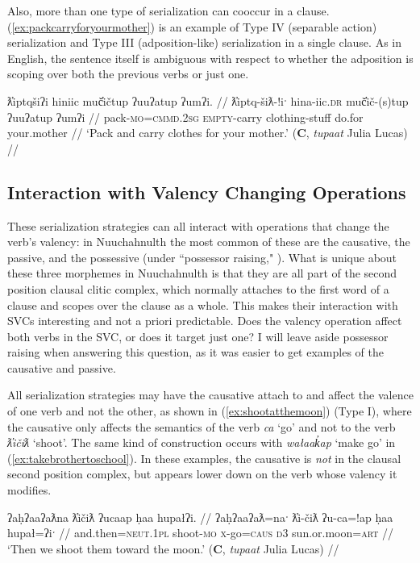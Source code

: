 Also, more than one type of serialization can cooccur in a clause. (\ref{ex:packcarryforyourmother}) is an example of Type IV (separable action) serialization and Type III (adposition-like) serialization in a single clause. As in English, the sentence itself is ambiguous with respect to whether the adposition is scoping over both the previous verbs or just one.

\ex \label{ex:packcarryforyourmother}
\begingl
\glpreamble ƛ̓iptqšiʔi hiniic muč̓ičtup ʔuuʔatup ʔumʔi. //
\gla ƛ̓iptq-šiƛ-!iˑ hina-iic.\textsc{dr} muč̓ič-(s)tup ʔuuʔatup ʔumʔi //
\glb pack-\textsc{mo}=\textsc{cmmd.2sg} \textsc{empty}-carry clothing-stuff do.for your.mother //
\glft `Pack and carry clothes for your mother.' (\textbf{C}, \textit{tupaat} Julia Lucas) //
\endgl
\xe

\subsection{Interaction with Valency Changing Operations} \label{ch:sv:valence}

These serialization strategies can all interact with operations that change the verb's valency: in Nuuchahnulth the most common of these are the causative, the passive, and the possessive (under ``possessor raising," \citealt{braithwaite2003}). What is unique about these three morphemes in Nuuchahnulth is that they are all part of the second position clausal clitic complex, which normally attaches to the first word of a clause and scopes over the clause as a whole. This makes their interaction with SVCs interesting and not a priori predictable. Does the valency operation affect both verbs in the SVC, or does it target just one? I will leave aside possessor raising when answering this question, as it was easier to get examples of the causative and passive.

All serialization strategies may have the causative attach to and affect the valence of one verb and not the other, as shown in (\ref{ex:shootatthemoon}) (Type I), where the causative only affects the semantics of the verb \textit{ca} `go' and not to the verb \textit{ƛ̓ičiƛ} `shoot'. The same kind of construction occurs with \textit{wałaak̓ap} `make go' in (\ref{ex:takebrothertoschool}). In these examples, the causative is \textit{not} in the clausal second position complex, but appears lower down on the verb whose valency it modifies.

\ex \label{ex:shootatthemoon}
\begingl
\glpreamble ʔaḥʔaaʔaƛna ƛ̓ičiƛ ʔucaap ḥaa hupałʔi. //
\gla ʔaḥʔaaʔaƛ=naˑ ƛ̓i-čiƛ ʔu-ca=!ap ḥaa hupał=ʔiˑ //
\glb and.then=\textsc{neut.1pl} shoot-\textsc{mo} \textsc{x}-go=\textsc{caus} \textsc{d3} sun.or.moon=\textsc{art} //
\glft `Then we shoot them toward the moon.' (\textbf{C}, \textit{tupaat} Julia Lucas) //
\endgl
\xe

